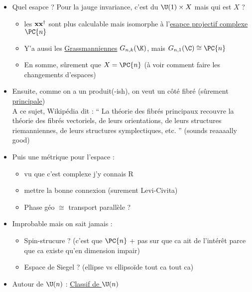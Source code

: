 \begin{itemize}
	
	\item Quel esapce ? Pour la jauge invariance, c'est du $\U(1)\times X$ mais qui est $X$ ? 
	\begin{itemize}
		\item les $\bf{x}\bf{x}^\dagger$ sont plus calculable mais isomorphe à l'\href{https://en.wikipedia.org/wiki/Complex_projective_space#Differential_geometry}{esapce projectif complexe} $\PC{n}$
		
		\item Y'a aussi les \href{https://fr.wikipedia.org/wiki/Grassmannienne}{Grassmanniennes} $G_{n,k}(\K)$, mais $G_{n, 1}(\C)\cong \PC{n}$
		
		\item En somme, sûrement que $X=\PC{n}$ (à voir comment faire les changements d'espaces)
	
	\end{itemize}
	
	\item Ensuite, comme on a un produit(-ish), on veut un côté fibré (sûrement \href{https://fr.wikipedia.org/wiki/Fibr%C3%A9_principal}{principale}) \\
	A ce sujet, Wikipédia dit : `` La théorie des fibrés principaux recouvre la théorie des fibrés vectoriels, de leurs orientations, de leurs structures riemanniennes, de leurs structures symplectiques, etc. '' (sounds reaaaally good)
	
	\item Puis une métrique pour l'espace :
	\begin{itemize}
		
		\item vu que c'est complexe j'y connais R
		
		\item mettre la bonne connexion (surement Levi-Civita)
		
		\item Phase géo $\cong$ transport parallèle ?
	\end{itemize} 
	
	\item Improbable mais on sait jamais :
	\begin{itemize}
		\item Spin-strucure ? (c'est que $\PC{n}$ + pas sur que ca ait de l'intérêt parce que ca existe qu'en dimension impair)
		
		\item Espace de Siegel ? (ellipse vs ellipsoïde tout ca tout ca)
	\end{itemize}
	
	\item Autour de $\U(n)$ : \href{https://en.wikipedia.org/wiki/Classifying_space_for_U(n)}{Classif de $\U(n)$}
\end{itemize}




